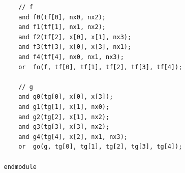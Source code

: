 \begin{problem}
\begin{solution}
\begin{enumerate}
\begin{verbatim}
                    // f
                    and f0(tf[0], nx0, nx2);
                    and f1(tf[1], nx1, nx2);
                    and f2(tf[2], x[0], x[1], nx3);
                    and f3(tf[3], x[0], x[3], nx1);
                    and f4(tf[4], nx0, nx1, nx3);
                    or  fo(f, tf[0], tf[1], tf[2], tf[3], tf[4]);

                    // g
                    and g0(tg[0], x[0], x[3]);
                    and g1(tg[1], x[1], nx0);
                    and g2(tg[2], x[1], nx2);
                    and g3(tg[3], x[3], nx2);
                    and g4(tg[4], x[2], nx1, nx3);
                    or  go(g, tg[0], tg[1], tg[2], tg[3], tg[4]);

                endmodule
            \end{verbatim}
        \end{enumerate}
    \end{solution}
\end{problem}